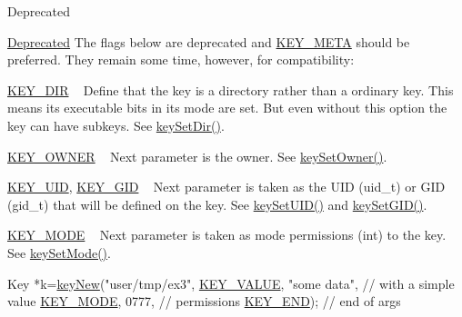 \begin{DoxyRefDesc}{Deprecated}
\item[\hyperlink{deprecated__deprecated000010}{Deprecated}]The flags below are deprecated and \hyperlink{group__key_gga91fb3178848bd682000958089abbaf40a040582834bb2d90049947d7ef74e87e2}{K\+E\+Y\+\_\+\+M\+E\+TA} should be preferred. They remain some time, however, for compatibility\+:
\begin{DoxyItemize}
\item \hyperlink{group__key_gga91fb3178848bd682000958089abbaf40a9e43e47c8a21478538e2d20e049981d5}{K\+E\+Y\+\_\+\+D\+IR} ~\newline
 Define that the key is a directory rather than a ordinary key. This means its executable bits in its mode are set. But even without this option the key can have subkeys. See \hyperlink{group__meta_gaae575bd86a628a15ee45baa860522e75}{key\+Set\+Dir()}.
\item \hyperlink{group__key_gga91fb3178848bd682000958089abbaf40a77ca60362fa8daca8d5347db4385068b}{K\+E\+Y\+\_\+\+O\+W\+N\+ER} ~\newline
 Next parameter is the owner. See \hyperlink{owner_8c_a88d6ec200ba0707b7c1b4a88133d2be4}{key\+Set\+Owner()}.
\item \hyperlink{group__key_gga91fb3178848bd682000958089abbaf40a28f01a87d65f065172f734c9c9446c0e}{K\+E\+Y\+\_\+\+U\+ID}, \hyperlink{group__key_gga91fb3178848bd682000958089abbaf40ac0628bbaba7c837ca73323681393d15f}{K\+E\+Y\+\_\+\+G\+ID} ~\newline
 Next parameter is taken as the U\+ID (uid\+\_\+t) or G\+ID (gid\+\_\+t) that will be defined on the key. See \hyperlink{group__meta_gab5f284f5ecd261e0a290095f50ba1af7}{key\+Set\+U\+I\+D()} and \hyperlink{group__meta_ga9e3d0fb3f7ba906e067727b9155d22e3}{key\+Set\+G\+I\+D()}.
\item \hyperlink{group__key_gga91fb3178848bd682000958089abbaf40a1b0a91ff3a855d6993930ebf0abaa518}{K\+E\+Y\+\_\+\+M\+O\+DE} ~\newline
 Next parameter is taken as mode permissions (int) to the key. See \hyperlink{group__meta_ga8803037e35b9da1ce492323a88ff6bc3}{key\+Set\+Mode()}. 
\begin{DoxyCodeInclude}
Key *k=\hyperlink{group__key_gad23c65b44bf48d773759e1f9a4d43b89}{keyNew}(\textcolor{stringliteral}{"user/tmp/ex3"},
        \hyperlink{group__key_gga91fb3178848bd682000958089abbaf40ac66e4a49d09212b79f5754ca6db5bd2e}{KEY\_VALUE}, \textcolor{stringliteral}{"some data"},    \textcolor{comment}{// with a simple value}
        \hyperlink{group__key_gga91fb3178848bd682000958089abbaf40a1b0a91ff3a855d6993930ebf0abaa518}{KEY\_MODE}, 0777,            \textcolor{comment}{// permissions}
        \hyperlink{group__key_gga91fb3178848bd682000958089abbaf40aa8adb6fcb92dec58fb19410eacfdd403}{KEY\_END});                  \textcolor{comment}{// end of args}
\end{DoxyCodeInclude}


\end{DoxyItemize}
\end{DoxyRefDesc}
